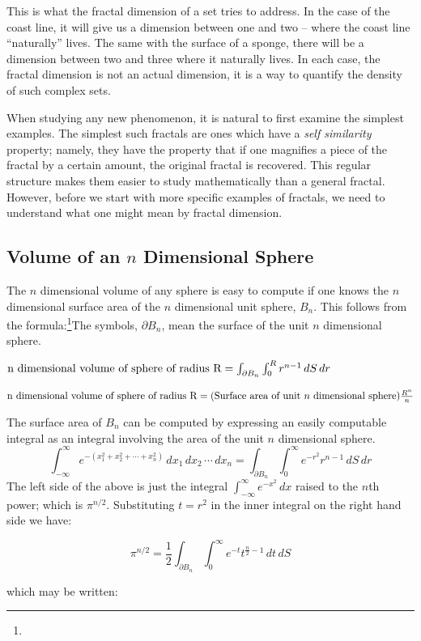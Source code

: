 This is what the fractal dimension of a set tries to address. 
In the case of the coast line, it will give us a dimension between one and two
-- where the coast line ``naturally'' lives. The same with the surface of
a sponge,
there will be a dimension between two and three where it naturally lives. In
each case, the fractal dimension is not an actual dimension, 
it is a way to quantify the density of such complex sets.

When studying any new phenomenon, it is natural to first examine the
simplest examples. The simplest such fractals are ones which have a
{\it self similarity} property; namely, they have the property that if
one magnifies a piece of the fractal by a certain amount, the original
fractal is recovered. This regular structure makes them easier to
study mathematically than a general fractal. However, before we start
with more specific examples of fractals, we need to understand what 
one might mean by fractal dimension.

\subsection{Volume of an $n$ Dimensional Sphere}
The $n$ dimensional volume of any sphere is easy to compute if one 
knows the $n$ dimensional surface area of the $n$ dimensional unit sphere, $B_n$.
This follows from the formula:\footnote{\dag}{The symbols, $\partial B_n$, mean the surface of the unit $n$ dimensional sphere.}

$\hbox{n dimensional volume of sphere of radius R} =  \int_{\partial B_n} \int_0^R r^{n-1} \,dS \,dr$

$\hbox{n dimensional volume of sphere of radius R} =  (\hbox{Surface area of unit $n$ dimensional sphere}) \frac{R^n}{n}$

The surface area of $B_n$ can be computed by expressing an easily computable 
integral as an integral involving the area of the unit $n$ dimensional sphere.
$$
\int_{-\infty}^{\infty} e^{-(x_1^2 + x_2^2 + \cdots + x_n^2)} \, dx_1\, dx_2
\, \cdots \, dx_n = \int_{\partial B_n} \int_0^\infty e^{-r^2} r^{n-1} \,
dS\, dr
$$
The left side of the above is just the integral
$\int_{-\infty}^{\infty} e^{-x^2} \, dx$ raised to the $n$th power;
which is $\pi^{n/2}$. Substituting $t = r^2$ in the inner integral on
the right hand side we have:

$$
\pi^{n/2} = \frac{1}{2} \int_{\partial B_n} \int_0^\infty 
e^{-t} t^{\frac{n}{2}-1} \,dt \, dS
$$

which may be written:

